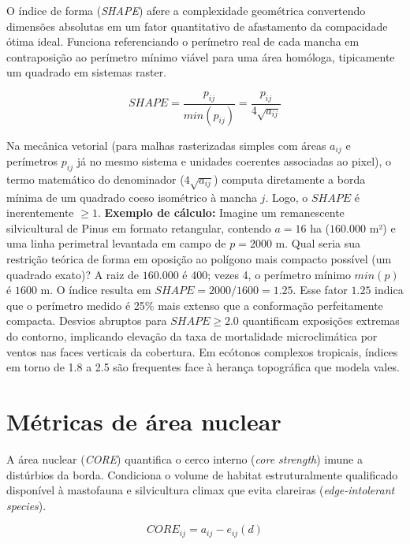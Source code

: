 \documentclass[
  portuguese,
  11pt,
  a4paper,
  open=any]{scrbook}
\begin{document}
O índice de forma (\emph{SHAPE}) afere a complexidade geométrica
convertendo dimensões absolutas em um fator quantitativo de afastamento
da compacidade ótima ideal. Funciona referenciando o perímetro real de
cada mancha em contraposição ao perímetro mínimo viável para uma área
homóloga, tipicamente um quadrado em sistemas raster.

\[
SHAPE = \frac{p_{ij}}{min(p_{ij})} = \frac{p_{ij}}{4\sqrt{a_{ij}}}
\]

Na mecânica vetorial (para malhas rasterizadas simples com áreas
\(a_{ij}\) e perímetros \(p_{ij}\) já no mesmo sistema e unidades
coerentes associadas ao pixel), o termo matemático do denominador
(\(4\sqrt{a_{ij}}\)) computa diretamente a borda mínima de um quadrado
coeso isométrico à mancha \(j\). Logo, o \(SHAPE\) é inerentemente
\(\geq 1\). \textbf{Exemplo de cálculo:} Imagine um remanescente
silvicultural de Pinus em formato retangular, contendo \(a = 16\) ha
(\(160.000\) m²) e uma linha perimetral levantada em campo de
\(p = 2000\) m. Qual seria sua restrição teórica de forma em oposição ao
polígono mais compacto possível (um quadrado exato)? A raiz de
\(160.000\) é 400; vezes 4, o perímetro mínimo \(min(p)\) é \(1600\) m.
O índice resulta em \(SHAPE = 2000 / 1600 = 1.25\). Esse fator \(1.25\)
indica que o perímetro medido é 25\% mais extenso que a conformação
perfeitamente compacta. Desvios abruptos para \(SHAPE \ge 2.0\)
quantificam exposições extremas do contorno, implicando elevação da taxa
de mortalidade microclimática por ventos nas faces verticais da
cobertura. Em ecótonos complexos tropicais, índices em torno de 1.8 a
2.5 são frequentes face à herança topográfica que modela vales.

\section{Métricas de área nuclear}\label{muxe9tricas-de-uxe1rea-nuclear}

A área nuclear (\emph{CORE}) quantifica o cerco interno (\emph{core
strength}) imune a distúrbios da borda. Condiciona o volume de habitat
estruturalmente qualificado disponível à mastofauna e silvicultura
climax que evita clareiras (\emph{edge-intolerant species}).

\[
CORE_{ij} = a_{ij} - e_{ij}(d)
\]
\end{document}
